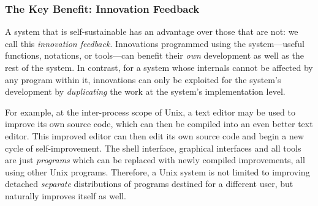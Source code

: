 \documentclass[ twoside,openright,titlepage,numbers=noenddot,headinclude,footinclude,cleardoublepage=empty,abstract=on,
                BCOR=5mm,paper=a4,fontsize=11pt
                ]{scrreprt}
\theoremstyle{definition}
\begin{document}
\hypertarget{the-key-benefit-innovation-feedback}{\subsubsection{The Key Benefit: Innovation
Feedback}\label{the-key-benefit-innovation-feedback}}

A system that is self-sustainable has an advantage over those that are
not: we call this \emph{innovation feedback}. Innovations programmed
using the system---useful functions, notations, or tools---can benefit
their \emph{own} development as well as the rest of the system. In
contrast, for a system whose internals cannot be affected by any program
within it, innovations can only be exploited for the system's
development by \emph{duplicating} the work at the system's
implementation level.

For example, at the inter-process scope of Unix, a text editor may be
used to improve its own source code, which can then be compiled into an
even better text editor. This improved editor can then edit its own
source code and begin a new cycle of self-improvement. The shell
interface, graphical interfaces and all tools are just \emph{programs}
which can be replaced with newly compiled improvements, all using other
Unix programs. Therefore, a Unix system is not limited to improving
detached \emph{separate} distributions of programs destined for a
different user, but naturally improves itself as well.
\end{document}
